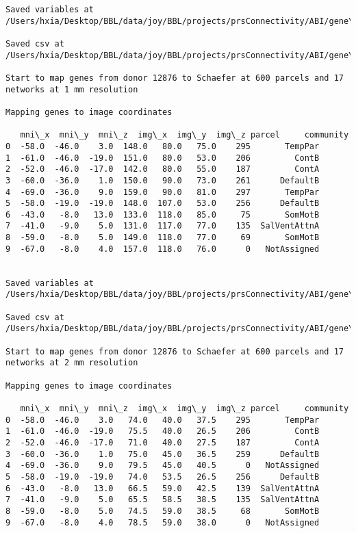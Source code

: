 \documentclass[11pt]{article}
\begin{document}
\begin{Verbatim}[commandchars=\\\{\}]
Saved variables at /Users/hxia/Desktop/BBL/data/joy/BBL/projects/prsConnectivity/ABI/gene\_mapping/12876donor\_600Parcels\_7Network\_2mm.pkl

Saved csv at /Users/hxia/Desktop/BBL/data/joy/BBL/projects/prsConnectivity/ABI/gene\_mapping/12876donor\_600Parcels\_7Network\_2mm.csv

Start to map genes from donor 12876 to Schaefer at 600 parcels and 17 networks at 1 mm resolution

Mapping genes to image coordinates

   mni\_x  mni\_y  mni\_z  img\_x  img\_y  img\_z parcel     community
0  -58.0  -46.0    3.0  148.0   80.0   75.0    295       TempPar
1  -61.0  -46.0  -19.0  151.0   80.0   53.0    206         ContB
2  -52.0  -46.0  -17.0  142.0   80.0   55.0    187         ContA
3  -60.0  -36.0    1.0  150.0   90.0   73.0    261      DefaultB
4  -69.0  -36.0    9.0  159.0   90.0   81.0    297       TempPar
5  -58.0  -19.0  -19.0  148.0  107.0   53.0    256      DefaultB
6  -43.0   -8.0   13.0  133.0  118.0   85.0     75       SomMotB
7  -41.0   -9.0    5.0  131.0  117.0   77.0    135  SalVentAttnA
8  -59.0   -8.0    5.0  149.0  118.0   77.0     69       SomMotB
9  -67.0   -8.0    4.0  157.0  118.0   76.0      0   NotAssigned


Saved variables at /Users/hxia/Desktop/BBL/data/joy/BBL/projects/prsConnectivity/ABI/gene\_mapping/12876donor\_600Parcels\_17Network\_1mm.pkl

Saved csv at /Users/hxia/Desktop/BBL/data/joy/BBL/projects/prsConnectivity/ABI/gene\_mapping/12876donor\_600Parcels\_17Network\_1mm.csv

Start to map genes from donor 12876 to Schaefer at 600 parcels and 17 networks at 2 mm resolution

Mapping genes to image coordinates

   mni\_x  mni\_y  mni\_z  img\_x  img\_y  img\_z parcel     community
0  -58.0  -46.0    3.0   74.0   40.0   37.5    295       TempPar
1  -61.0  -46.0  -19.0   75.5   40.0   26.5    206         ContB
2  -52.0  -46.0  -17.0   71.0   40.0   27.5    187         ContA
3  -60.0  -36.0    1.0   75.0   45.0   36.5    259      DefaultB
4  -69.0  -36.0    9.0   79.5   45.0   40.5      0   NotAssigned
5  -58.0  -19.0  -19.0   74.0   53.5   26.5    256      DefaultB
6  -43.0   -8.0   13.0   66.5   59.0   42.5    139  SalVentAttnA
7  -41.0   -9.0    5.0   65.5   58.5   38.5    135  SalVentAttnA
8  -59.0   -8.0    5.0   74.5   59.0   38.5     68       SomMotB
9  -67.0   -8.0    4.0   78.5   59.0   38.0      0   NotAssigned



\end{Verbatim}
\end{document}
